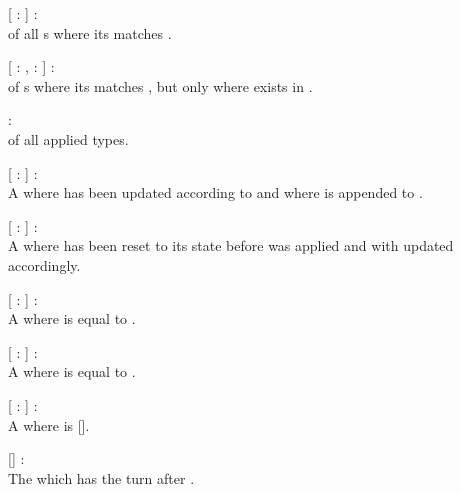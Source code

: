 \begin{dlist}
  \item {}[  :  ] : \\
   of all s where its  matches
  .
  
  \item {}[  : ,  :  ] : \\
   of s where its  matches
  , but only  where  exists in
  .
  
  \item {} : \\
   of all applied  types.
  
  \item {}[  :  ] : \\
  A  where  has been updated according to
   and where  is appended to
  .
  
  \item {}[  :  ] : \\
  A  where  has been reset to its state before
   was applied and with  updated accordingly.
  
  \item {}[  :  ] : \\
  A  where  is equal to .
  
  \item {}[  :  ] : \\
  A  where  is equal to .
  
  \item {}[  :  ] : \\
  A  where  is [].
  
  \item {}[] : \\
  The  which has the turn after .
\end{dlist}

